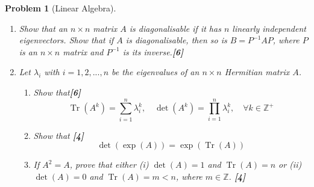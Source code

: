 \documentclass[a4paper]{article}
\DeclareMathOperator{\Tr}{Tr}
\theoremstyle{new}
\newtheorem{qns}{Problem}[section]
\begin{document}
\newpage
\begin{qns}[Linear Algebra]\leavevmode
\begin{enumerate}[label=(\roman*)]
\item Show that an $n\times n$ matrix $A$ is diagonalisable if it has $n$ linearly independent eigenvectors. Show that if $A$ is diagonalisable, then so is $B = P^{−1}AP$, where $P$ is an $n\times n$ matrix and $P^{−1}$ is its inverse.\hfill \textbf{[6]}
\item Let $\lambda_i$ with $i=1,2,...,n$ be the eigenvalues of an $n\times n$ Hermitian matrix $A$.
\begin{enumerate}[label=(\alph*)]
\item Show that\hfill \textbf{[6]}
$$\Tr(A^k)=\sum_{i=1}^n\lambda_i^k,\quad \det(A^k)=\prod_{i=1}^n\lambda_i^k,\quad \forall k\in\mathbb{Z}^+$$
\item Show that \hfill \textbf{[4]}
$$\det(\exp(A))=\exp(\Tr(A))$$
\item If $A^2=A$, prove that either (i) $\det(A)=1$ and $\Tr(A)=n$ or (ii) $\det(A)=0$ and $\Tr(A)=m<n$, where $m\in\mathbb{Z}$. \hfill \textbf{[4]}
\end{enumerate}
\end{enumerate}
\end{qns}
\end{document}
